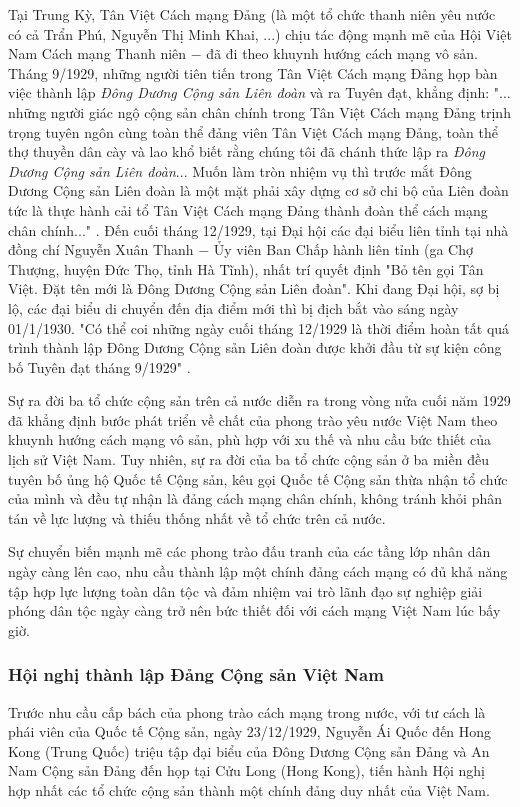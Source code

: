 Tại Trung Kỳ, Tân Việt Cách mạng Đảng (là một tổ chức thanh niên yêu nước có cả Trẩn Phú, Nguyễn Thị Minh Khai, ...) chịu tác động mạnh mẽ của Hội Việt Nam Cách mạng Thanh niên $-$ đã đi theo khuynh hướng cách mạng vô sản. Tháng 9/1929, những người tiên tiến trong Tân Việt Cách mạng Đảng họp bàn việc thành lập \textit{Đông Dương Cộng sản Liên đoàn} và ra Tuyên đạt, khẳng định: "... những người giác ngộ cộng sản chân chính trong Tân Việt Cách mạng Đảng trịnh trọng tuyên ngôn cùng toàn thể đảng viên Tân Việt Cách mạng Đảng, toàn thể thợ thuyền dân cày và lao khổ biết rằng chúng tôi đã chánh thức lập ra \textit{Đông Dương Cộng sản Liên đoàn}... Muốn làm tròn nhiệm vụ thì trước mắt Đông Dương Cộng sản Liên đoàn là một mặt phải xây dựng cơ sở chi bộ của Liên đoàn tức là thực hành cải tổ Tân Việt Cách mạng Đảng thành đoàn thể cách mạng chân chính..." . Đến cuối tháng 12/1929, tại Đại hội các đại biểu liên tỉnh tại nhà đồng chí Nguyễn Xuân Thanh $-$ Ủy viên Ban Chấp hành liên tỉnh (ga Chợ Thượng, huyện Đức Thọ, tỉnh Hà Tĩnh), nhất trí quyết định "Bỏ tên gọi Tân Việt. Đặt tên mới là Đông Dương Cộng sản Liên đoàn". Khi đang Đại hội, sợ bị lộ, các đại biểu di chuyển đến địa điểm mới thì bị địch bắt vào sáng ngày 01/1/1930. "Có thể coi những ngày cuối tháng 12/1929 là thời điểm hoàn tất quá trình thành lập Đông Dương Cộng sản Liên đoàn được khởi đầu từ sự kiện công bố Tuyên đạt tháng 9/1929" .

Sự ra đời ba tổ chức cộng sản trên cả nước diễn ra trong vòng nửa cuối năm 1929 đã khẳng định bước phát triển về chất của phong trào yêu nước Việt Nam theo khuynh hướng cách mạng vô sản, phù hợp với xu thế và nhu cầu bức thiết của lịch sử Việt Nam. Tuy nhiên, sự ra đời của ba tổ chức cộng sản ở ba miền đều tuyên bố ủng hộ Quốc tế Cộng sản, kêu gọi Quốc tế Cộng sản thừa nhận tổ chức của mình và đều tự nhận là đảng cách mạng chân chính, không tránh khỏi phân tán về lực lượng và thiếu thống nhất về tổ chức trên cả nước.

Sự chuyển biến mạnh mẽ các phong trào đấu tranh của các tầng lớp nhân dân ngày càng lên cao, nhu cầu thành lập một chính đảng cách mạng có đủ khả năng tập hợp lực lượng toàn dân tộc và đảm nhiệm vai trò lãnh đạo sự nghiệp giải phóng dân tộc ngày càng trở nên bức thiết đối với cách mạng Việt Nam lúc bấy giờ.

\subsubsection{Hội nghị thành lập Đảng Cộng sản Việt Nam}
Trước nhu cầu cấp bách của phong trào cách mạng trong nước, với tư cách là phái viên của Quốc tế Cộng sản, ngày 23/12/1929, Nguyễn Ái Quốc đến Hong Kong (Trung Quốc) triệu tập đại biểu của Đông Dương Cộng sản Đảng và An Nam Cộng sản Đảng đến họp tại Cửu Long (Hong Kong), tiến hành Hội nghị hợp nhất các tổ chức cộng sản thành một chính đảng duy nhất của Việt Nam.

